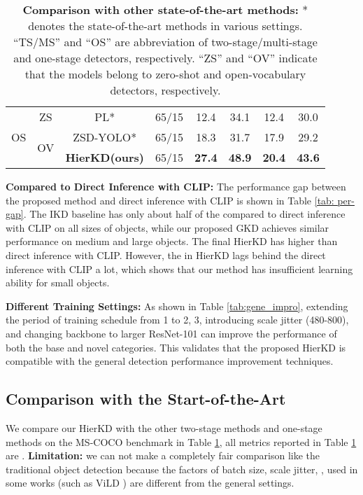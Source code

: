 \documentclass[10pt,twocolumn,letterpaper]{article}
\begin{document}
\begin{table}[]
{\begin{tabular}{ccc|c|c|ccc}
\multicolumn{1}{c|}{\multirow{3}{*}{OS}} & \multicolumn{1}{c|}{ZS} & PL*\cite{rahman2020improved} & 65/15 & 12.4 & 34.1 & 12.4 & 30.0 \\ \cline{2-8} 
\multicolumn{1}{c|}{} & \multicolumn{1}{c|}{\multirow{2}{*}{OV}} & ZSD-YOLO*\cite{xie2021zsd} & 65/15 & 18.3 & 31.7 & 17.9 & 29.2 \\
\multicolumn{1}{c|}{} & \multicolumn{1}{c|}{} & \textbf{HierKD(ours)} & 65/15 & \textbf{27.4} & \textbf{48.9} & \textbf{20.4} & \textbf{43.6} \\ \hline
\end{tabular}
}
\caption{\textbf{Comparison with other state-of-the-art methods:} * denotes the state-of-the-art methods in various settings. ``TS/MS'' and ``OS'' are abbreviation of two-stage/multi-stage and one-stage detectors, respectively. ``ZS'' and ``OV'' indicate that the models belong to zero-shot and open-vocabulary detectors, respectively.}
\label{tab:com-sota}
\vspace{-1.8em}
\end{table}



\noindent \textbf{Compared to Direct Inference with CLIP:} The performance gap between the proposed method and direct inference with CLIP is shown in Table \ref{tab: per-gap}. The IKD baseline has only about half of the  compared to direct inference with CLIP on all sizes of objects, while our proposed GKD achieves similar performance on medium and large objects. The final HierKD has higher  than direct inference with CLIP. However, the  in HierKD lags behind the direct inference with CLIP a lot, which shows that our method has insufficient learning ability for small objects.


\noindent \textbf{Different Training Settings:} As shown in Table \ref{tab:gene_impro}, extending the period of training schedule from 1 to 2, 3, introducing scale jitter (480-800), and changing backbone to larger ResNet-101 can improve the performance of both the base and novel categories. This validates that the proposed HierKD is compatible with the general detection performance improvement techniques.

\subsection{Comparison with the Start-of-the-Art}
We compare our HierKD with the other two-stage methods and one-stage methods on the MS-COCO benchmark in Table \ref{tab:com-sota}, all metrics reported in Table \ref{tab:com-sota} are .
\textbf{Limitation:} we can not make a completely fair comparison like the traditional object detection because the factors of batch size, scale jitter, \etc, used in some works (such as ViLD \cite{gu2021zero}) are different from the general settings.
\end{document}
